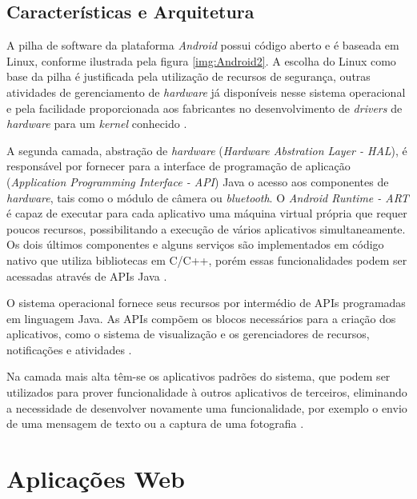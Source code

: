 \subsection{Características e Arquitetura}

A pilha de software da plataforma \textit{Android} possui código aberto e é baseada em Linux, conforme ilustrada pela figura \ref{img:Android2}. A escolha do Linux como base da pilha é justificada pela utilização de recursos de segurança, outras atividades de gerenciamento de \textit{hardware} já disponíveis nesse sistema operacional e pela facilidade proporcionada aos fabricantes no desenvolvimento de \textit{drivers} de \textit{hardware} para um \textit{kernel} conhecido \cite{SITEANDROID, gandhewar2010google}.


A segunda camada, abstração de \textit{hardware} (\textit{Hardware Abstration Layer - HAL}), é responsável por fornecer para a interface de programação de aplicação (\textit{Application Programming Interface - API}) Java o acesso aos componentes de \textit{hardware}, tais como o módulo de câmera ou \textit{bluetooth}. O \textit{Android Runtime - ART} é capaz de executar para cada aplicativo uma máquina virtual própria que requer poucos recursos, possibilitando a execução de vários aplicativos simultaneamente. Os dois últimos componentes e alguns serviços são implementados em código nativo que utiliza bibliotecas em C/C++, porém essas funcionalidades podem ser acessadas através de APIs Java \cite{SITEANDROID}.

O sistema operacional fornece seus recursos por intermédio de APIs programadas em linguagem Java. As APIs compõem os blocos necessários para a criação dos aplicativos, como o sistema de visualização e os gerenciadores de recursos, notificações e atividades \cite{SITEANDROID}.

Na camada mais alta têm-se os aplicativos padrões do sistema, que podem ser utilizados para prover funcionalidade à outros aplicativos de terceiros, eliminando a necessidade de desenvolver novamente uma funcionalidade, por exemplo o envio de uma mensagem de texto ou a captura de uma fotografia \cite{SITEANDROID, saha2008developer}.

\section{Aplicações Web}

